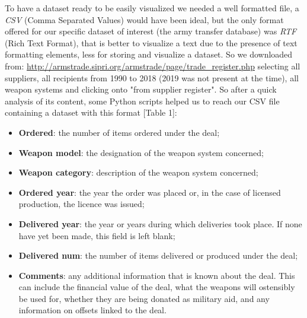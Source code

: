 \documentclass{article}
\begin{document}
\begin{multicols}{2}
To have a dataset ready to be easily visualized we needed a well formatted file, a \textit{CSV} (Comma Separated Values) would have been ideal, but the only format offered for our specific dataset of interest (the army transfer database) was \textit{RTF} (Rich Text Format), that is better to visualize a text due to the presence of text formatting elements, less for storing and visualize a dataset. So we downloaded from: \url{http://armstrade.sipri.org/armstrade/page/trade_register.php} selecting all suppliers, all recipients from 1990 to 2018 (2019 was not present at the time), all weapon systems and clicking onto "from supplier register". So after a quick analysis of its content, some Python scripts helped us to reach our CSV file containing a dataset with this format [Table 1]:
\begin{itemize}
\item \textbf{Ordered}: the number of items ordered under the deal;
\item \textbf{Weapon model}: the designation of the weapon system concerned;
\item \textbf{Weapon category}: description of the weapon system concerned;
\item \textbf{Ordered year}: the year the order was placed or, in the case of licensed production, the licence was issued;
\item \textbf{Delivered year}: the year or years during which deliveries took place. If none have yet been made, this field is left blank;
\item \textbf{Delivered num}: the number of items delivered or produced under the deal;
\item \textbf{Comments}: any additional information that is known about the deal. This can include the financial value of the deal, what the weapons will ostensibly be used for, whether they are being donated as military aid, and any information on offsets linked to the deal.
 
\end{itemize}

\begin{center}
	\begin{table}[hbt!]
		

\end{table}
\end{center}
\end{multicols}
\end{document}
